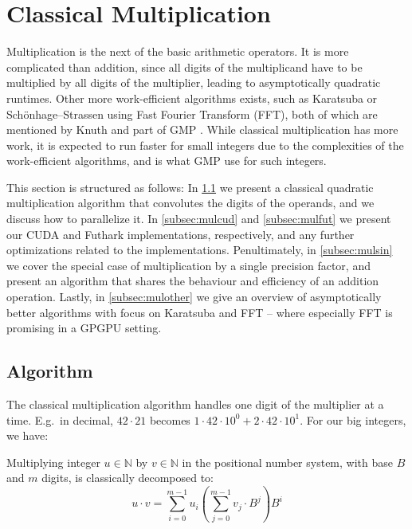 \section{Classical Multiplication}
\label{sec:mul}

Multiplication is the next of the basic arithmetic operators. It is more
complicated than addition, since all digits of the multiplicand have to be
multiplied by all digits of the multiplier, leading to asymptotically quadratic
runtimes. Other more work-efficient algorithms exists, such as Karatsuba or
Schönhage–Strassen using Fast Fourier Transform (FFT), both of which are
mentioned by Knuth and part of GMP \cite{knuth97,GMP}. While classical
multiplication has more work, it is expected to run faster for small integers
due to the complexities of the work-efficient algorithms, and is what GMP use
for such integers. %

This section is structured as follows: In \ref{subsec:mulalg} we present a
classical quadratic multiplication algorithm that convolutes the digits of the
operands, and we discuss how to parallelize it. In \ref{subsec:mulcud} and
\ref{subsec:mulfut} we present our CUDA and Futhark implementations,
respectively, and any further optimizations related to the
implementations. Penultimately, in \ref{subsec:mulsin} we cover the special case
of multiplication by a single precision factor, and present an algorithm that
shares the behaviour and efficiency of an addition operation. Lastly, in
\ref{subsec:mulother} we give an overview of asymptotically better algorithms
with focus on Karatsuba and FFT -- where especially FFT is promising in a GPGPU
setting.

\subsection{Algorithm}
\label{subsec:mulalg}

The classical multiplication algorithm handles one digit of the multiplier at a
time. E.g.\ in decimal, $42\cdot 21$ becomes
$1 \cdot 42 \cdot 10^{0} + 2 \cdot 42 \cdot 10^{1}$. For our big integers, we have:

\begin{definition}\label{def:clasmul}
  Multiplying integer $u\in \mathbb{N}$ by $v \in \mathbb{N}$ in the positional number system, with
  base $B$ and $m$ digits, is classically decomposed to:
\begin{equation}
  \label{eq:clasmul0}
  u \cdot v = \sum_{i=0}^{m-1}u_i\left( \sum_{j=0}^{m-1}v_j\cdot B^{j} \right)B^{i}
\end{equation}
\end{definition}

